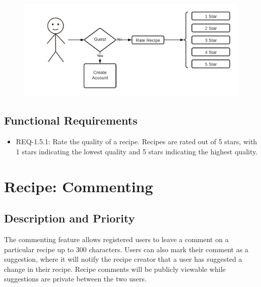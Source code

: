 \documentclass{scrreprt}
\begin{document}
\begin{figure}[H]\centering
    \includegraphics[width=\columnwidth]{FlowCharts/Recipe-Rating.png}
\end{figure}

\subsection{\gls{Functional Requirements}}

\begin{itemize}
    \item REQ-1.5.1: Rate the quality of a recipe. Recipes are rated out of 5 stars, with 1 stars indicating the lowest quality and 5 stars indicating the highest quality.
\end{itemize}

\section{Recipe: Commenting}

\subsection{Description and Priority}

The commenting feature allows registered users to leave a comment on a particular recipe up to 300 characters. Users can also mark their comment as a suggestion, where it will notify the recipe creator that a user has suggested a change in their recipe. Recipe comments will be publicly viewable while suggestions are private between the two users.
\end{document}
